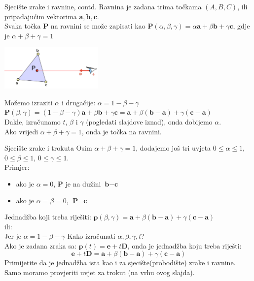 \documentclass[9pt]{beamer}
\begin{document}
\begin{frame}{Sjecište zrake i ravnine, contd.}
Ravnina je zadana trima točkama $(A, B, C)$, ili pripadajućim vektorima $\mathbf{a}, \mathbf{b}, \mathbf{c}$.\\
Svaka točka $\mathbf{P}$ na ravnini se može zapisati kao  $\mathbf{P}(\alpha, \beta, \gamma) = \alpha\mathbf{a} + \beta\mathbf{b}+\gamma\mathbf{c}$, gdje je $\alpha + \beta +\gamma =1$
\begin{center}
\includegraphics[width=5cm]{slike/ray_trokut_01.png}
\end{center}
Možemo izraziti $\alpha$ i drugačije: $\alpha = 1- \beta - \gamma$ \\
$\mathbf{P}(\beta, \gamma) = (1- \beta - \gamma)\mathbf{a} + \beta\mathbf{b}+\gamma\mathbf{c} = \mathbf{a} + \beta(\mathbf{b}-\mathbf{a}) + \gamma(\mathbf{c}-\mathbf{a})$\\
Dakle, izračunamo $t$, $\beta$ i $\gamma$ (pogledati slajdove iznad), onda dobijemo $\alpha$. \\
Ako vrijedi $\alpha + \beta +\gamma =1$, onda je točka na ravnini.
\end{frame}	


\begin{frame}{Sjecište zrake i trokuta}
Osim $\alpha + \beta +\gamma =1$, dodajemo još tri uvjeta $0 \leq \alpha \leq 1$, $0 \leq \beta \leq 1$, $0 \leq \gamma \leq 1$.\\
Primjer: 
\begin{itemize}
\item ako je $\alpha=0$, $\textbf{P}$ je na dužini $\textbf{b} - \textbf{c}$
\item ako je $\alpha=\beta=0$, $\textbf{P} = \textbf{c}$
\end{itemize}
Jednadžba koji treba riješiti:
$\textbf{p}(\beta, \gamma) = \textbf{a} + \beta(\textbf{b}-\textbf{a}) + \gamma(\textbf{c}-\textbf{a})$\\
ili:
\\ Jer je $\alpha = 1- \beta - \gamma$
Kako izračunati $\alpha, \beta, \gamma, t$?\\
Ako je zadana zraka sa: $\textbf{p}(t) = \textbf{e}+t\textbf{D}$, onda je jednadžba koju treba riješti:
$$\textbf{e}+t\textbf{D} = \textbf{a} + \beta(\textbf{b}-\textbf{a}) + \gamma(\textbf{c}-\textbf{a})$$
Primijetite da je jednadžba ista kao i za sjecište(probodište) zrake i ravnine. \\
Samo moramo provjeriti uvjet za trokut (na vrhu ovog slajda).


\end{frame}	
\end{document}
